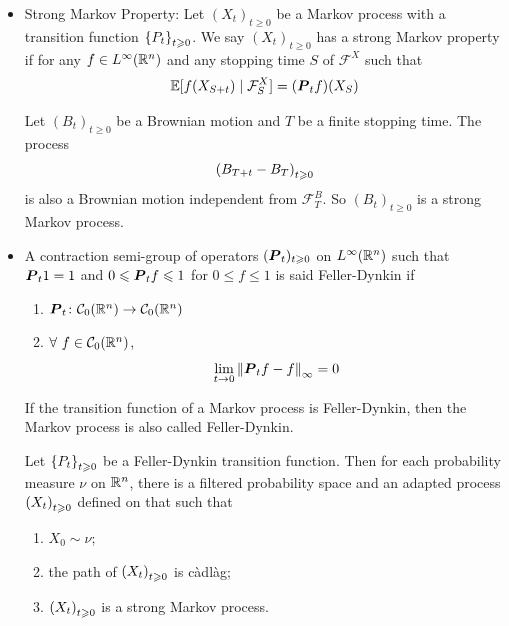 \documentclass[a4paper,12pt]{article}
\begin{document}
\begin{itemize}
  \item Strong Markov Property: Let $(X_t)_{t \geqslant 0}$ be a Markov process with a transition function $\left\{P_t\right\}_{t \geqslant 0}$. We say $(X_t)_{t \geqslant 0}$ has a strong Markov property if for any $f \in L^{\infty}(\mathbb{R}^n)$ and any stopping time $S$ of $\mathcal{F}^X$ such that
  \begin{equation*}
    \mathbb{E}[f(X_{S+t}) \mid \mathcal{F}^X_S] = (\boldsymbol{P}_tf)(X_S)
  \end{equation*}

  \noindent Let $(B_t)_{t \geqslant 0}$ be a Brownian motion and $T$ be a finite stopping time. The process
  \begin{equation*}
    \left(B_{T+t}-B_T\right)_{t\geqslant 0}
  \end{equation*}
  is also a Brownian motion independent from $\mathcal{F}^B_T$. So $(B_t)_{t \geqslant 0}$ is a strong Markov process.

  \item A contraction semi-group of operators $(\boldsymbol{P}_t)_{t \geqslant 0}$ on $L^{\infty}(\mathbb{R}^n)$ such that $\boldsymbol{P}_t1 = 1$ and $0\leqslant\boldsymbol{P}_tf\leqslant 1$ for $0\leqslant f\leqslant 1$ is said Feller-Dynkin if 
  \begin{enumerate}[label=(\arabic*)]
    \item $\boldsymbol{P}_t \colon \mathcal{C}_0(\mathbb{R}^n) \rightarrow \mathcal{C}_0(\mathbb{R}^n)$
    \item $\forall~f \in \mathcal{C}_0(\mathbb{R}^n)$,
    \begin{equation*}
      \lim_{t \rightarrow 0}\left\lVert\boldsymbol{P}_tf - f\right\lVert_{\infty} = 0
    \end{equation*}
  \end{enumerate}
  If the transition function of a Markov process is Feller-Dynkin, then the Markov process is also called Feller-Dynkin.

  \begin{thm}
    Let $\left\{P_t\right\}_{t\geqslant 0}$ be a Feller-Dynkin transition function. Then for each probability measure $\nu$ on $\mathbb{R}^n$, there is a filtered probability space and an adapted process $\left(X_t\right)_{t\geqslant 0}$ defined on that such that
    \begin{enumerate}[label=(\arabic*)]
      \item $X_0 \sim \nu$;
      \item the path of $\left(X_t\right)_{t\geqslant 0}$ is c\`adl\`ag;
      \item $\left(X_t\right)_{t\geqslant 0}$ is a strong Markov process.
    \end{enumerate}
  \end{thm}


\end{itemize}
\end{document}
